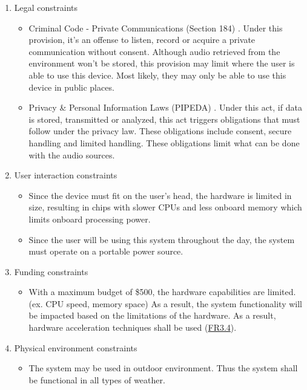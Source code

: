 \documentclass[12pt]{article}
\theoremstyle{definition}
\begin{document}
\begin{enumerate}
  \item Legal constraints
  \begin{itemize}
    \item Criminal Code - Private Communications (Section 184)
    \cite{CriminalCode184}. Under this provision, it's an offense to listen,
    record or acquire a private communication without consent. Although audio
    retrieved from the environment won't be stored, this provision may limit
    where the user is able to use this device. Most likely, they may only be
    able to use this device in public places.
    \item Privacy \& Personal Information Laws (PIPEDA) \cite{PIPEDA2000}. Under
    this act, if data is stored, transmitted or analyzed, this act triggers
    obligations that must follow under the privacy law. These obligations
    include consent, secure handling and limited handling. These obligations
    limit what can be done with the audio sources.
  \end{itemize}

  \item User interaction constraints
  \begin{itemize}
    \item Since the device must fit on the user's head, the hardware is limited
    in size, resulting in chips with slower CPUs and less onboard memory which
    limits onboard processing power. 
    \item Since the user will be using this system throughout the day, the
    system must operate on a portable power source.
  \end{itemize}

  \item Funding constraints
  \begin{itemize}
    \item With a maximum budget of \$500, the hardware capabilities are limited.
    (ex. CPU speed, memory space) As a result, the system functionality will be
    impacted based on the limitations of the hardware. As a result, hardware
    acceleration techniques shall be used (\hyperref[FR3_4]{FR3.4}).
  \end{itemize}

  \item Physical environment constraints
  \begin{itemize}
    \item The system may be used in outdoor environment. Thus the system shall
    be functional in all types of weather.
  \end{itemize}
\end{enumerate}
\end{document}
